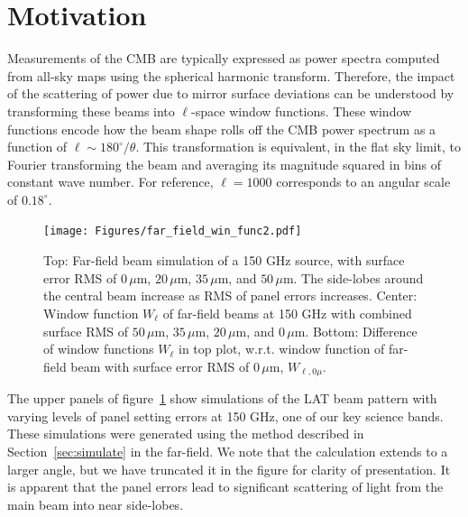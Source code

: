 \section{Motivation}
\label{sec:motive}

Measurements of the CMB are typically expressed as power spectra computed from all-sky maps using the spherical harmonic transform.  Therefore, the impact of the scattering of power due to mirror surface deviations can be understood by transforming these beams into $\ell$-space window functions.  These window functions encode how the beam shape rolls off the CMB power spectrum as a function of $\ell \sim 180^\circ / \theta$.  This transformation is equivalent, in the flat sky limit, to Fourier transforming the beam and averaging its magnitude squared in bins of constant wave number.  For reference, $\ell = 1000$ corresponds to an angular scale of $0.18^\circ$.

\begin{figure}[t]
    \centering
    \texttt{[image: Figures/far\_field\_win\_func2.pdf]}
    \caption{Top: Far-field beam simulation of a 150 GHz source, with surface error RMS of $0\,\mu$m, $20\,\mu$m, $35\,\mu$m, and $50\,\mu$m. The side-lobes around the central beam increase as RMS of panel errors increases. Center: Window function $W_\ell$ of far-field beams at 150 GHz with combined surface RMS of $50\,\mu$m, $35\,\mu$m, $20\,\mu$m, and $0\,\mu$m. Bottom: Difference of window functions $W_\ell$ in top plot, w.r.t. window function of far-field beam with surface error RMS of $0\,\mu$m, $W_{\ell,0\mu}$.}
    \label{fig:win_func}
\end{figure}
The upper panels of figure~\ref{fig:win_func} show simulations of the LAT beam pattern with varying levels of panel setting errors at 150 GHz, one of our key science bands.  These simulations were generated using the method described in Section~\ref{sec:simulate} in the far-field.  We note that the calculation extends to a larger angle, but we have truncated it in the figure for clarity of presentation.  It is apparent that the panel errors lead to significant scattering of light from the main beam into near side-lobes.

